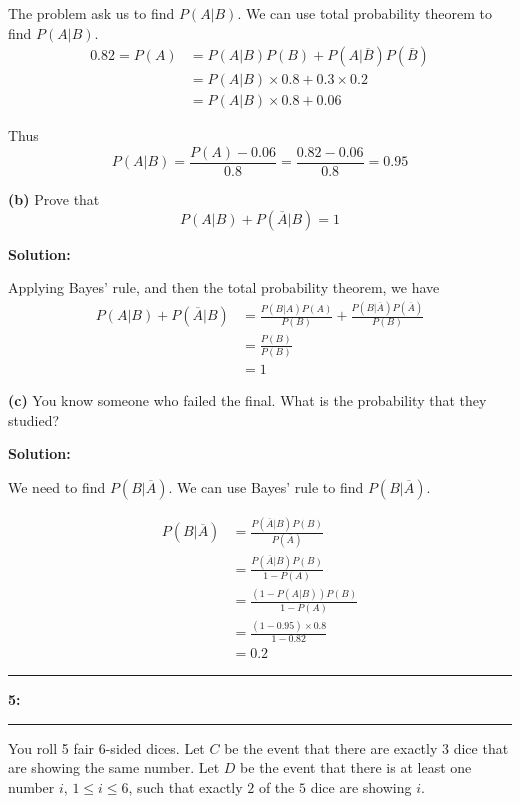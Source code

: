 \documentclass[11pt]{article}
\newcommand\question[2]{\vspace{.25in}\hrule\textbf{#1: #2}\vspace{.5em}\hrule\vspace{.10in}}
\renewcommand\part[1]{\vspace{.10in}\textbf{(#1)}}
\newcommand{\solution}{\vspace{.10in}\textbf{Solution: }}
\begin{document}
The problem ask us to find $P(A|B)$. We can use total probability theorem to find $P(A|B)$.
\begin{align*}
  0.82 = P(A) &= P(A|B)P(B) + P(A|\overline{B})P(\overline{B}) \\
       &= P(A|B)\times 0.8 + 0.3 \times 0.2 \\ 
       &= P(A|B)\times 0.8 + 0.06
\end{align*}

Thus 
\begin{equation*}
  P(A|B) = \frac{P(A) - 0.06}{0.8} = \frac{0.82 - 0.06}{0.8} = 0.95
\end{equation*}

\part{b} Prove that 
\begin{equation*}
  P(A|B) + P(\overline{A}|B) = 1
\end{equation*}

\solution

Applying Bayes' rule, and then the total probability theorem, we have
\begin{align*}
  P(A|B) + P(\overline{A}|B) &= \frac{P(B|A)P(A)}{P(B)} + \frac{P(B|\overline{A})P(\overline{A})}{P(B)} \\
      &= \frac{P(B)}{P(B)} \\
      &= 1
\end{align*}

\part{c} You know someone who failed the final. What is the probability that they studied?

\solution

We need to find $P(B|\overline{A})$. We can use Bayes' rule to find $P(B|\overline{A})$.

\begin{align*}
  P(B|\overline{A}) &= \frac{P(\overline{A}|B)P(B)}{P(\overline{A})} \\
      &= \frac{P(\overline{A}|B)P(B)}{1 - P(A)} \\
      &= \frac{(1-P(A|B))P(B)}{1 - P(A)} \\
      &= \frac{(1-0.95)\times 0.8}{1 - 0.82} \\
      &= 0.2
\end{align*}

\question{5}{}
You roll 5 fair 6-sided dices. Let $C$ be the event that there are exactly $3$ dice that are showing the same number. Let $D$ be the event that there is at least one number $i$, $1 \le i \le 6$, such that exactly $2$ of the $5$ dice are showing $i$.
\end{document}
